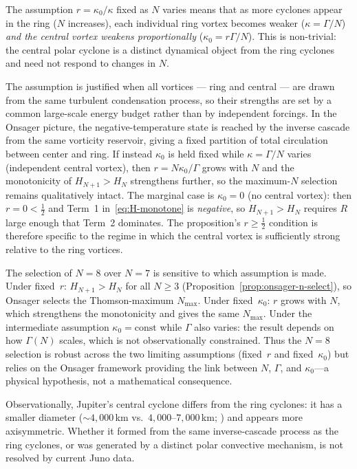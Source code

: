 \begin{remark}
\label{rem:fixed-r}
The assumption $r = \kappa_0/\kappa$ fixed as $N$ varies means that
as more cyclones appear in the ring ($N$ increases), each individual
ring vortex becomes weaker ($\kappa = \Gamma/N$) \emph{and the central
vortex weakens proportionally} ($\kappa_0 = r\Gamma/N$).  This is
non-trivial: the central polar cyclone is a distinct dynamical object
from the ring cyclones and need not respond to changes in $N$.

The assumption is justified when all vortices --- ring and central ---
are drawn from the same turbulent condensation process, so their
strengths are set by a common large-scale energy budget rather than
by independent forcings.  In the Onsager picture, the negative-temperature
state is reached by the inverse cascade from the same vorticity
reservoir, giving a fixed partition of total circulation between center
and ring.  If instead $\kappa_0$ is held fixed while $\kappa = \Gamma/N$
varies (independent central vortex), then $r = N\kappa_0/\Gamma$ grows
with $N$ and the monotonicity of $H_{N+1} > H_N$ strengthens further,
so the maximum-$N$ selection remains qualitatively intact.  The
marginal case is $\kappa_0 = 0$ (no central vortex): then
$r = 0 < \tfrac12$ and Term~1 in~\eqref{eq:H-monotone} is
\emph{negative}, so $H_{N+1} > H_N$ requires $R$ large enough that
Term~2 dominates.  The proposition's $r \ge \tfrac{1}{2}$ condition
is therefore specific to the regime in which the central vortex is
sufficiently strong relative to the ring vortices.

The selection of $N = 8$ over $N = 7$ is sensitive to which assumption
is made.  Under fixed~$r$: $H_{N+1} > H_N$ for all $N \ge 3$
(Proposition~\ref{prop:onsager-n-select}), so Onsager selects the
Thomson-maximum $N_{\max}$.  Under fixed~$\kappa_0$: $r$ grows with
$N$, which strengthens the monotonicity and gives the same $N_{\max}$.
Under the intermediate assumption $\kappa_0 = \mathrm{const}$ while
$\Gamma$ also varies: the result depends on how $\Gamma(N)$ scales,
which is not observationally constrained.  Thus the $N = 8$
selection is robust across the two limiting assumptions (fixed~$r$
and fixed~$\kappa_0$) but relies on the Onsager framework providing
the link between $N$, $\Gamma$, and $\kappa_0$---a physical
hypothesis, not a mathematical consequence.

Observationally, Jupiter's central cyclone differs from the ring
cyclones: it has a smaller diameter
($\sim\!4{,}000$\,km vs.\ $4{,}000$--$7{,}000$\,km;
\citealt{Adriani2018}) and appears more axisymmetric.  Whether it
formed from the same inverse-cascade process as the ring cyclones,
or was generated by a distinct polar convective mechanism, is not
resolved by current Juno data.
\end{remark}

